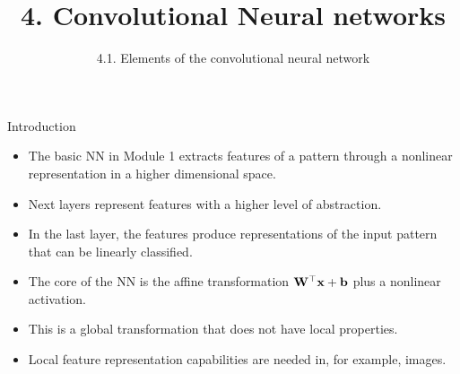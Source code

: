\documentclass{beamer}
\title{4. Convolutional Neural networks}
\subtitle{4.1. Elements of the convolutional neural network}
\begin{document}
\maketitle

\begin{frame}{Introduction}
\begin{itemize}
    \item The basic NN in Module 1 extracts features of a pattern through a nonlinear representation in a higher dimensional space. 
    \item Next layers represent features with a higher level of abstraction.
    \item In the last layer, the features produce representations of the input pattern that can be linearly classified. 

    \item The core of the NN is the affine transformation ${\bf W}^\top {\bf x} +{\bf b}$ plus a nonlinear activation. 

    \item This is a global transformation that does not have local properties. 

    \item Local feature representation capabilities are needed in, for example, images. 
\end{itemize}
\end{frame}
\end{document}

